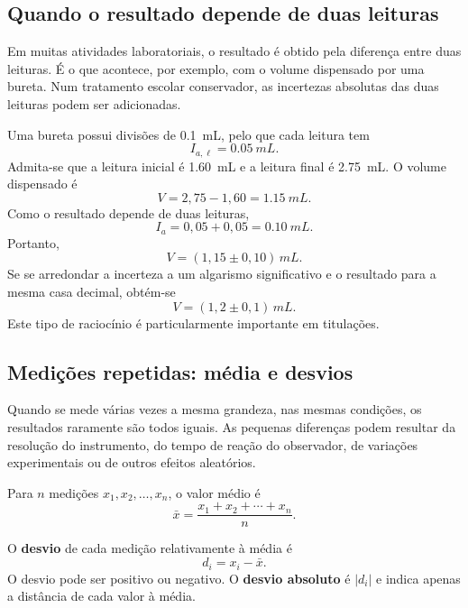 \documentclass[11pt,a4paper,openany]{book}
\begin{document}
\subsection{Quando o resultado depende de duas leituras}

Em muitas atividades laboratoriais, o resultado é obtido pela diferença entre duas leituras. É o que acontece, por exemplo, com o volume dispensado por uma bureta. Num tratamento escolar conservador, as incertezas absolutas das duas leituras podem ser adicionadas.

\begin{exemploresolvido}
Uma bureta possui divisões de \SI{0.1}{mL}, pelo que cada leitura tem
\[
I_{a,\ell}=\SI{0.05}{mL}.
\]
Admita-se que a leitura inicial é \SI{1.60}{mL} e a leitura final é \SI{2.75}{mL}. O volume dispensado é
\[
V=2,75-1,60=\SI{1.15}{mL}.
\]
Como o resultado depende de duas leituras,
\[
I_a=0,05+0,05=\SI{0.10}{mL}.
\]
Portanto,
\[
V=(1,15\pm0,10)\,\si{mL}.
\]
Se se arredondar a incerteza a um algarismo significativo e o resultado para a mesma casa decimal, obtém-se
\[
\boxed{V=(1,2\pm0,1)\,\si{mL}}.
\]
Este tipo de raciocínio é particularmente importante em titulações. \cite{SPF2022}
\end{exemploresolvido}

\subsection{Medições repetidas: média e desvios}

Quando se mede várias vezes a mesma grandeza, nas mesmas condições, os resultados raramente são todos iguais. As pequenas diferenças podem resultar da resolução do instrumento, do tempo de reação do observador, de variações experimentais ou de outros efeitos aleatórios.

Para $n$ medições $x_1,x_2,\ldots,x_n$, o valor médio é
\[
\bar{x}=\frac{x_1+x_2+\cdots+x_n}{n}.
\]

O \textbf{desvio} de cada medição relativamente à média é
\[
\boxed{d_i=x_i-\bar{x}}.
\]
O desvio pode ser positivo ou negativo. O \textbf{desvio absoluto} é $|d_i|$ e indica apenas a distância de cada valor à média.
\end{document}
